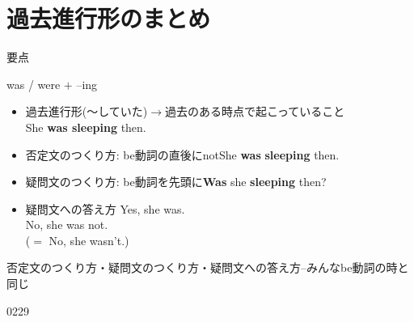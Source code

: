 \documentclass[aspectratio=169,xcolor={dvipsnames,table}]{beamer}
\begin{document}
\section{過去進行形のまとめ}
\begin{frame}[plain]{要点}
 
\begin{block}{was / were $+$ --ing}
\begin{itemize}[square]\small
 \item 過去進行形(〜していた)$\longrightarrow$過去のある時点で起こっていること\\%
\hfill{}She {\bfseries was sleeping} then.
 \item 否定文のつくり方: be動詞の直後にnot\hfill{}She {\bfseries was}  {\bfseries sleeping} then.
 \item 疑問文のつくり方: be動詞を先頭に\hfill{}{\bfseries Was} she {\bfseries sleeping} then?
 \item 疑問文への答え方
\hfill{}Yes, she was.\\
\hfill{}No, she was not.\\
\hfill{}($=$ No, she wasn't.)
\end{itemize}
\hfill{{\scriptsize 否定文のつくり方・疑問文のつくり方・疑問文への答え方--みんなbe動詞の時と同じ}}
\end{block}

\hfill{\tiny 0229}\,{\scriptsize {}}
\end{frame}
\end{document}
